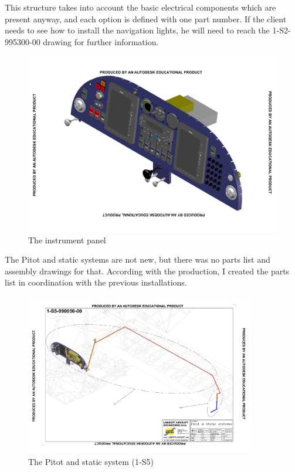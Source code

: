 \documentclass[11pt,a4paper]{article}
\begin{document}
This structure takes into account the basic electrical components which are present anyway, and each option is defined with one part number. If the client needs to see how to install the navigation lights, he will need to reach the 1-S2-995300-00 drawing for further information.

\begin{figure}[ht!]
	\begin{center}
		\includegraphics[width=15cm,trim = 2cm 2.2cm 2cm 2.2cm, clip]{pics/PIC016.pdf}
		\caption{The instrument panel}
		\label{fig:PIC016}
	\end{center}
\end{figure}

\bigskip

The Pitot and static systems are not new, but there was no parts list and assembly drawings for that. According with the production, I created the parts list in coordination with the previous installations.
\begin{figure}[ht!]
	\begin{center}
		\includegraphics[width=10cm,trim = 1.5cm 1.5cm 1.5cm 1.5cm, clip]{pics/PIC017.pdf}
		\caption{The Pitot and static system (1-S5)}
		\label{fig:PIC017}
	\end{center}
\end{figure}
\end{document}
